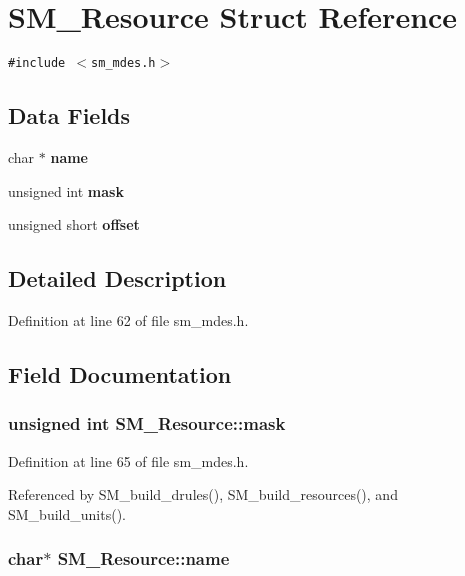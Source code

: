 \section{SM\_\-Resource Struct Reference}
\label{structSM__Resource}
{\tt \#include $<$sm\_\-mdes.h$>$}

\subsection*{Data Fields}
\begin{CompactItemize}
\item 
char $\ast$ \bf{name}
\item 
unsigned int \bf{mask}
\item 
unsigned short \bf{offset}
\end{CompactItemize}


\subsection{Detailed Description}




Definition at line 62 of file sm\_\-mdes.h.

\subsection{Field Documentation}
\subsubsection{\setlength{\rightskip}{0pt plus 5cm}unsigned int \bf{SM\_\-Resource::mask}}\label{structSM__Resource_ad7ff7f7fac9aa8a9d6a26d54cc44f1b}




Definition at line 65 of file sm\_\-mdes.h.

Referenced by SM\_\-build\_\-drules(), SM\_\-build\_\-resources(), and SM\_\-build\_\-units().
\subsubsection{\setlength{\rightskip}{0pt plus 5cm}char$\ast$ \bf{SM\_\-Resource::name}}\label{structSM__Resource_3aa6bf364dba61fa4b037a8f3c1a63ff}




